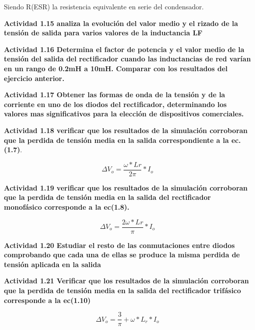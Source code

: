 \documentclass[letterpaper]{article}
\begin{document}
Siendo R(ESR) la resistencia equivalente en serie del condensador. 
 \begin{large}

\textbf{Actividad 1.15 analiza la evolución del valor medio y el rizado de
la tensión de salida para varios valores de la inductancia LF}\end{large}
 \begin{large}

\textbf{Actividad 1.16 Determina el factor de potencia y el valor medio de
la tensión del salida del rectificador cuando las inductancias de
red varían en un rango de 0.2mH a 10mH. Comparar con los resultados
del ejercicio anterior.} \end{large}
 \begin{large}

\textbf{Actividad 1.17 Obtener las formas de onda de la tensión y de la corriente
en uno de los diodos del rectificador, determinando los valores mas
significativos para la elección de dispositivos comerciales.} \end{large}
 \begin{large}

\textbf{Actividad 1.18 verificar que los resultados de la simulación corroboran
que la perdida de tensión media en la salida correspondiente a la
ec.(1.7)}.\end{large}
 \begin{large}

\[
\Delta V_{o}=\frac{\omega*L{r}}{2\pi}*I_{o}
\]\end{large}
 \begin{large}

\textbf{Actividad 1.19 verificar que los resultados de la simulación corroboran
que la perdida de tensión media en la salida del rectificador monofásico
corresponde a la ec(1.8).}\end{large}
 \begin{large}

\[
\Delta V_{o}=\frac{2\omega*L{r}}{\pi}*I_{o}
\]\end{large}
 \begin{large}

\textbf{Actividad 1.20 Estudiar el resto de las conmutaciones entre diodos
comprobando que cada una de ellas se produce la misma perdida de tensión
aplicada en la salida} \end{large}
 \begin{large}

\textbf{Actividad 1.21 Verificar que los resultados de la simulación corroboran
que la perdida de tensión media en la salida del rectificador trifásico
corresponde a la ec(1.10)}\end{large} \begin{large}

\[
\Delta V_{o}=\frac{3}{\pi}+\omega*L_{r}*I_{o}
\]
	\end{large}
    
\end{document}
